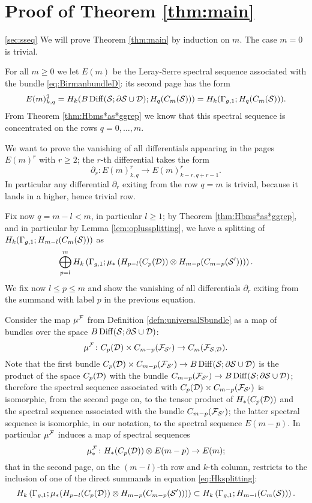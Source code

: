 \section{Proof of Theorem \ref{thm:main}}
\ref{sec:sseq}
We will prove Theorem \ref{thm:main} by induction on $m$.
The case $m=0$ is trivial.

For all $m\geq 0$ we let $E(m)$ be the Leray-Serre spectral sequence associated with
the bundle \eqref{eq:BirmanbundleD}: its second page has the form
\[
 E(m)^2_{k,q}=H_k(B\operatorname{Diff}(\mathcal{S};\partial\mathcal{S}\cup\mathcal{D});H_q(C_m(\mathcal{S})))=H_k(\Gamma_{g,1};H_q(C_m(\mathcal{S}))).
\]
From Theorem \ref{thm:Hbms*as*ggrep} we know that this spectral sequence is concentrated
on the rows $q=0,\dots, m$.

We want to prove the vanishing of all differentials appearing in the pages
$E(m)^r$ with $r\geq 2$; the $r$-th differential takes the form
\[
 \partial_r\colon E(m)^r_{k,q}\to E(m)^r_{k-r,q+r-1}.
\]
In particular any differential $\partial_r$ exiting from the row $q=m$ is trivial,
because it lands in a higher, hence trivial row.

Fix now $q=m-l<m$, in particular $l\geq 1$; by Theorem \ref{thm:Hbms*as*ggrep}, and
in particular by Lemma \ref{lem:oplussplitting}, we have a splitting of $H_k(\Gamma_{g,1};H_{m-l}(C_m(\mathcal{S})))$ as
\begin{equation}
\label{eq:Hksplitting}
 \bigoplus_{p=l}^m H_k\left(\Gamma_{g,1};\mu_*\left(H_{p-l}(C_p(\mathcal{D}))\otimes H_{m-p}(C_{m-p}(\mathcal{S}'))\right)\right).
\end{equation} 
We fix now $l\leq p\leq m$ and show the vanishing of all differentials $\partial_r$ exiting from the
summand with label $p$ in the previous equation.

Consider the map $\mu^{\mathcal{F}}$ from Definition \ref{defn:universalSbundle} as a map of
bundles over the space $B\operatorname{Diff}(\mathcal{S};\partial\mathcal{S}\cup\mathcal{D})$:
\[
 \mu^{\mathcal{F}}\colon C_p(\mathcal{D})\times C_{m-p}(\mathcal{F}_{\mathcal{S}'})\to C_m(\mathcal{F}_{\mathcal{S},\mathcal{D}}).
\]
Note that the first bundle $C_p(\mathcal{D})\times C_{m-p}(\mathcal{F}_{\mathcal{S}'})\to B\operatorname{Diff}(\mathcal{S};\partial\mathcal{S}\cup\mathcal{D})$
is the product of the space $C_p(\mathcal{D})$ with the bundle $C_{m-p}(\mathcal{F}_{\mathcal{S}'})\to B\operatorname{Diff}(\mathcal{S};\partial\mathcal{S}\cup\mathcal{D})$;
therefore the spectral sequence associated with $C_p(\mathcal{D})\times C_{m-p}(\mathcal{F}_{\mathcal{S}'})$ is isomorphic,
from the second page on, to the tensor product
of $H_*(C_p(\mathcal{D}))$ and the spectral sequence associated with the bundle $C_{m-p}(\mathcal{F}_{\mathcal{S}'})$; the
latter spectral sequence is isomorphic, in our notation, to the spectral sequence $E(m-p)$.
In particular $\mu^{\mathcal{F}}$ induces a map of spectral
sequences
\[
\mu^{\mathcal{F}}_*\colon H_*(C_p(\mathcal{D}))\otimes E(m-p)\to E(m);
\]
that in the second page, on the $(m-l)$-th row and $k$-th column, restricts to
the inclusion of one of the direct summands in equation \eqref{eq:Hksplitting}:
\[
H_k\left(\Gamma_{g,1};\mu_*(H_{p-l}(C_p(\mathcal{D}))\otimes H_{m-p}(C_{m-p}(\mathcal{S}')))\right)\subset H_k\left(\Gamma_{g,1};H_{m-l}(C_m(\mathcal{S}))\right).
\]

